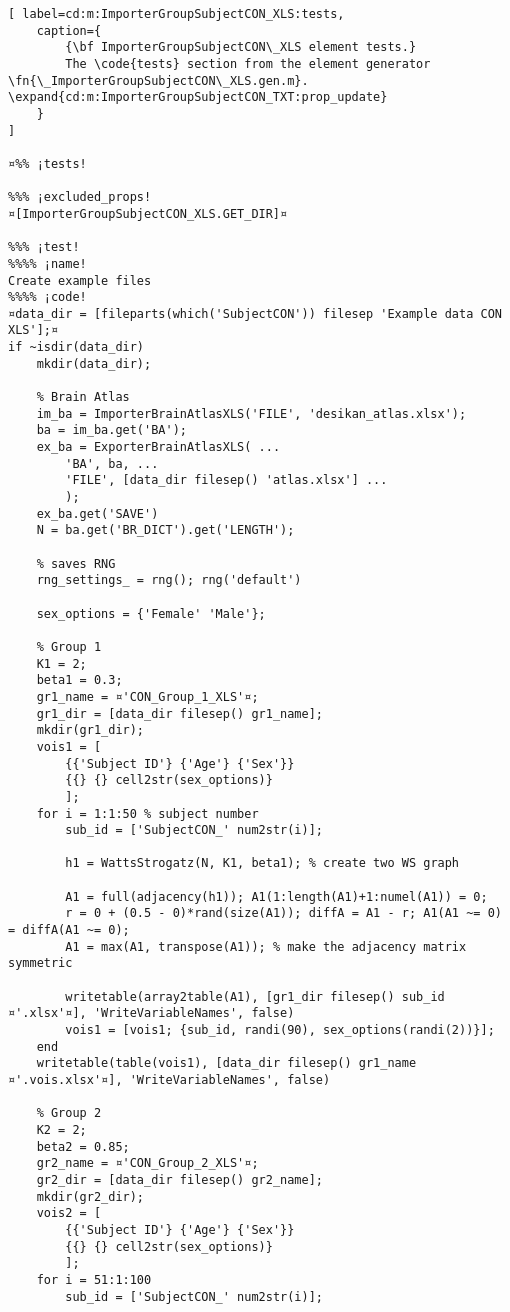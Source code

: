 \documentclass{tufte-handout}
\begin{document}
\clearpage
\begin{lstlisting}[	label=cd:m:ImporterGroupSubjectCON_XLS:tests,
	caption={
		{\bf ImporterGroupSubjectCON\_XLS element tests.}
		The \code{tests} section from the element generator \fn{\_ImporterGroupSubjectCON\_XLS.gen.m}. \expand{cd:m:ImporterGroupSubjectCON_TXT:prop_update}
	}
]

¤%% ¡tests!

%%% ¡excluded_props!
¤[ImporterGroupSubjectCON_XLS.GET_DIR]¤

%%% ¡test!
%%%% ¡name!
Create example files
%%%% ¡code!
¤data_dir = [fileparts(which('SubjectCON')) filesep 'Example data CON XLS'];¤
if ~isdir(data_dir)
    mkdir(data_dir);

    % Brain Atlas
    im_ba = ImporterBrainAtlasXLS('FILE', 'desikan_atlas.xlsx');
    ba = im_ba.get('BA');
    ex_ba = ExporterBrainAtlasXLS( ...
        'BA', ba, ...
        'FILE', [data_dir filesep() 'atlas.xlsx'] ...
        );
    ex_ba.get('SAVE')
    N = ba.get('BR_DICT').get('LENGTH');

    % saves RNG
    rng_settings_ = rng(); rng('default')

    sex_options = {'Female' 'Male'};

    % Group 1
    K1 = 2; 
    beta1 = 0.3; 
    gr1_name = ¤'CON_Group_1_XLS'¤;
    gr1_dir = [data_dir filesep() gr1_name];
    mkdir(gr1_dir);
    vois1 = [
        {{'Subject ID'} {'Age'} {'Sex'}}
        {{} {} cell2str(sex_options)}
        ];
    for i = 1:1:50 % subject number
        sub_id = ['SubjectCON_' num2str(i)];

        h1 = WattsStrogatz(N, K1, beta1); % create two WS graph

        A1 = full(adjacency(h1)); A1(1:length(A1)+1:numel(A1)) = 0; 
        r = 0 + (0.5 - 0)*rand(size(A1)); diffA = A1 - r; A1(A1 ~= 0) = diffA(A1 ~= 0); 
        A1 = max(A1, transpose(A1)); % make the adjacency matrix symmetric

        writetable(array2table(A1), [gr1_dir filesep() sub_id ¤'.xlsx'¤], 'WriteVariableNames', false)
        vois1 = [vois1; {sub_id, randi(90), sex_options(randi(2))}];
    end
    writetable(table(vois1), [data_dir filesep() gr1_name ¤'.vois.xlsx'¤], 'WriteVariableNames', false)

    % Group 2
    K2 = 2; 
    beta2 = 0.85; 
    gr2_name = ¤'CON_Group_2_XLS'¤;
    gr2_dir = [data_dir filesep() gr2_name];
    mkdir(gr2_dir);
    vois2 = [
        {{'Subject ID'} {'Age'} {'Sex'}}
        {{} {} cell2str(sex_options)}
        ];
    for i = 51:1:100
        sub_id = ['SubjectCON_' num2str(i)];


\end{lstlisting}
\end{document}
